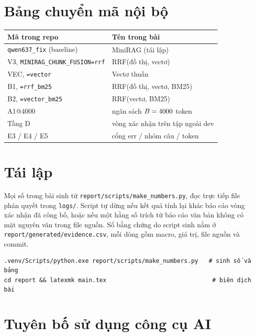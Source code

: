\section{Bảng chuyển mã nội bộ}\label{app:codes}
\begin{table}[h]\centering\small
\begin{tabular}{ll}
\toprule
Mã trong repo & Tên trong bài \\
\midrule
\texttt{qwen637\_fix} (baseline) & MiniRAG (tái lập) \\
V3, \texttt{MINIRAG\_CHUNK\_FUSION=rrf} & RRF(đồ thị, vectơ) \\
VEC, \texttt{=vector} & Vectơ thuần \\
B1, \texttt{=rrf\_bm25} & RRF(đồ thị, vectơ, BM25) \\
B2, \texttt{=vector\_bm25} & RRF(vectơ, BM25) \\
A1@4000 & ngân sách $B = 4000$ token \\
Tầng D & vòng xác nhận trên tập ngoài dev \\
E3 / E4 / E5 & cổng err / nhóm câu / token \\
\bottomrule
\end{tabular}
\end{table}

\section{Tái lập}\label{app:repro}
Mọi số trong bài sinh từ \texttt{report/scripts/make\_numbers.py}, đọc trực tiếp file phán quyết trong \texttt{logs/}.
Script tự dừng nếu kết quả tính lại khác báo cáo vòng xác nhận đã công bố, hoặc nếu một hằng số trích từ báo cáo văn bản không có mặt nguyên văn trong file nguồn.
Sổ bằng chứng do script sinh nằm ở \texttt{report/generated/evidence.csv}, mỗi dòng gồm macro, giá trị, file nguồn và commit.
\begin{small}
\begin{verbatim}
.venv/Scripts/python.exe report/scripts/make_numbers.py   # sinh số và bảng
cd report && latexmk main.tex                              # biên dịch bài
\end{verbatim}
\end{small}

\section{Tuyên bố sử dụng công cụ AI}\label{app:ai}

